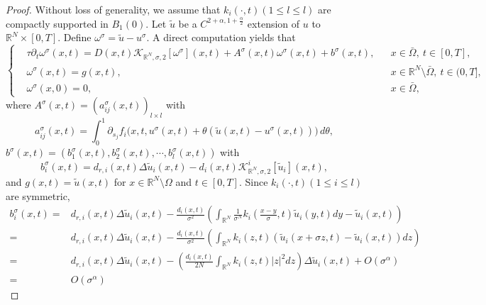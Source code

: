 \documentclass[10pt,a4paper]{amsart}
\begin{document}
\begin{proof}
Without loss of generality, we assume that $k_{i}(\cdot,t)(1 \leq l \leq l)$ are compactly supported in $B_{1}(0)$.
Let $\tilde{u}$ be a $C^{2+\alpha,1+\frac{\alpha}{2}}$ extension of $u$ to $\mathbb{R}^{N}\times[0,T]$.
Define $\omega^{\sigma}= \tilde{u}- u^{\sigma}$.
A direct computation yields that
\begin{equation}\label{3-7}
\left\{
\begin{aligned}
&\tau\partial_t\omega^\sigma(x,t)
= D(x,t)\mathcal{K}_{\mathbb{R}^N,\sigma,2}[\omega^\sigma](x,t)
+ A^\sigma(x,t)\omega^\sigma(x,t) + b^\sigma(x,t),
&& x\in\bar\Omega,\ t\in[0,T],\\
&\omega^\sigma(x,t)=g(x,t), && x\in\mathbb{R}^N\setminus\bar\Omega,\ t\in(0,T],\\
&\omega^\sigma(x,0)=0, && x\in\bar\Omega,
\end{aligned}
\right.
\end{equation}
where $A^\sigma(x,t)=(a_{ij}^\sigma(x,t))_{l\times l}$ with
\begin{equation*}
a_{ij}^\sigma(x,t)=\int_0^1 \partial_{s_j}f_i\bigl(x,t,u^\sigma(x,t)+\theta(\tilde u(x,t)-u^\sigma(x,t))\bigr)\,d\theta,
\end{equation*}
$b^{\sigma}(x,t) = \left(b_{1}^{\sigma}(x,t), b_{2}^{\sigma}(x,t) , \cdots, b_{l}^{\sigma}(x,t) \right)$ with
\begin{equation*}
b_{i}^{\sigma}(x,t)=d_{r,i}(x,t)\Delta \tilde{u}_{i}(x,t) -d_{i}(x,t)\mathcal{K}^{i}_{\mathbb{R}^{N},\sigma,2}[\tilde{u}_{i}](x,t),
\end{equation*}
and
$g(x,t)=\tilde{u}(x,t)$ for $x\in \mathbb{R}^{N}\setminus\Omega $ and $t\in [0,T]$.
%
%
Since $k_{i}(\cdot,t) (1\leq i \leq l) $ are symmetric,
\begin{align*}
b_{i}^{\sigma}(x,t)
=&d_{r,i}(x,t)\Delta \tilde{u}_{i}(x,t) - \frac{d_{i}(x,t)}{\sigma^{2}}
\left( \int_{\mathbb{R}^{N}} \frac{1}{\sigma^{N}}k_{i}\left(\frac{x-y}{\sigma},t\right)\tilde{u}_{i}(y,t)dy-\tilde{u}_{i}(x,t) \right)
\\
=& d_{r,i}(x,t)\Delta \tilde{u}_{i}(x,t) - \frac{d_{i}(x,t)}{\sigma^{2}}\left(\int_{\mathbb{R}^{N}}k_{i}(z,t)\left(\tilde{u}_{i}(x+\sigma z,t)-\tilde{u}_{i}(x,t)\right)dz \right)
\\
=& d_{r,i}(x,t)\Delta \tilde{u}_{i}(x,t) -   \left(\frac{d_{i}(x,t)}{2N}\int_{\mathbb{R}^{N}}k_{i}(z,t)|z|^{2}dz\right) \Delta \tilde{u}_{i}(x,t)+O(\sigma^{\alpha})
\\
=&O(\sigma^{\alpha})
\end{align*}

\end{proof}
\end{document}
